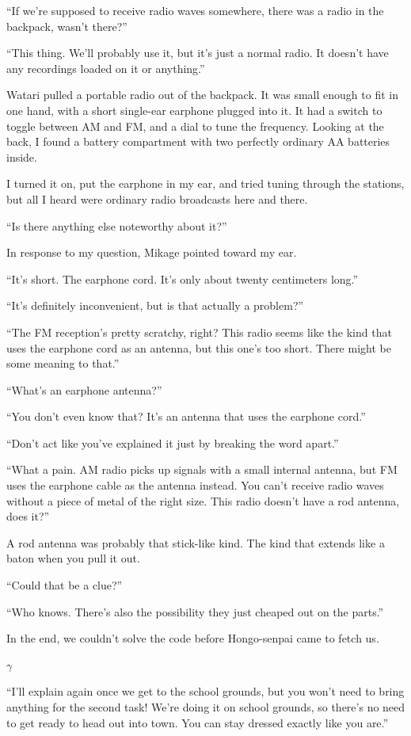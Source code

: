 \documentclass[
    a4paper,
    12pt,
    twoside,
    openany,
    UTF8,
    fontset=windows
]{ctexbook}
\begin{document}
``If we're supposed to receive radio waves somewhere, there was a radio in the backpack, wasn't there?''

``This thing. We'll probably use it, but it's just a normal radio. It doesn't have any recordings loaded on it or anything.''

Watari pulled a portable radio out of the backpack. It was small enough to fit in one hand, with a short single-ear earphone plugged into it. It had a switch to toggle between AM and FM, and a dial to tune the frequency. Looking at the back, I found a battery compartment with two perfectly ordinary AA batteries inside.

I turned it on, put the earphone in my ear, and tried tuning through the stations, but all I heard were ordinary radio broadcasts here and there.

``Is there anything else noteworthy about it?''

In response to my question, Mikage pointed toward my ear.

``It's short. The earphone cord. It's only about twenty centimeters long.''

``It's definitely inconvenient, but is that actually a problem?''

``The FM reception's pretty scratchy, right? This radio seems like the kind that uses the earphone cord as an antenna, but this one's too short. There might be some meaning to that.''

``What's an earphone antenna?''

``You don't even know that? It's an antenna that uses the earphone cord.''

``Don't act like you've explained it just by breaking the word apart.''

``What a pain. AM radio picks up signals with a small internal antenna, but FM uses the earphone cable as the antenna instead. You can't receive radio waves without a piece of metal of the right size. This radio doesn't have a rod antenna, does it?''

A rod antenna was probably that stick-like kind. The kind that extends like a baton when you pull it out.

``Could that be a clue?''

``Who knows. There's also the possibility they just cheaped out on the parts.''

In the end, we couldn't solve the code before Hongo-senpai came to fetch us.

$\gamma$

``I'll explain again once we get to the school grounds, but you won't need to bring anything for the second task! We're doing it on school grounds, so there's no need to get ready to head out into town. You can stay dressed exactly like you are.''
\end{document}
